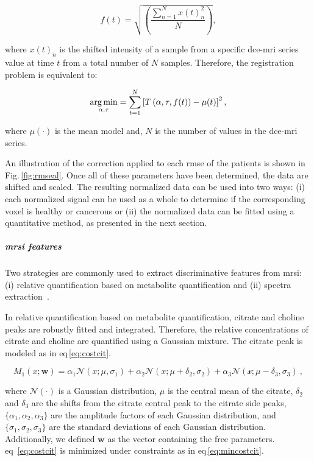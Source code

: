 \documentclass[a4paper,num-refs]{wiley-article}
\begin{document}
\begin{equation}
  f(t) = \sqrt{ \left( \frac{\sum_{n=1}^{N} x(t)_{n}^2}{N}  \right) },
  \label{eq:rmsd}
\end{equation}

\noindent where $x(t)_n$ is the shifted intensity of a sample from a specific
\ac{dce}-\ac{mri} series value at time $t$ from a total number of $N$ samples.
Therefore, the registration problem is equivalent to:

\begin{equation}
  \operatorname*{arg\,min}_{\alpha, \tau} = \sum_{t=1}^{N} \left[ T\left(\alpha, \tau, f(t)\right) - \mu(t) \right]^{2} ,
  \label{eq:cost}
\end{equation}

\noindent where $\mu(\cdot)$ is the mean model and, $N$ is the number of values
in the \ac{dce}-\ac{mri} series.

An illustration of the correction applied to each \ac{rmse} of the patients is
shown in Fig.\,\ref{fig:rmseal}. Once all of these parameters have been
determined, the data are shifted and scaled. The resulting normalized data can
be used into two ways: (i) each normalized signal can be used as a whole to
determine if the corresponding voxel is healthy or cancerous or (ii) the
normalized data can be fitted using a quantitative method, as presented in the
next section.

\subparagraph{\ac{mrsi} features}

Two strategies are commonly used to extract discriminative features from
\ac{mrsi}: (i) relative quantification based on metabolite quantification and
(ii) spectra extraction~\cite{Parfait2012}.

In relative quantification based on metabolite quantification, citrate and
choline peaks are robustly fitted and integrated. Therefore, the relative
concentrations of citrate and choline are quantified using a Gaussian
mixture. The citrate peak is modeled as in \acs{eq}\,\eqref{eq:costcit}.

\begin{equation}
  M_1(x; \mathbf{w}) = \alpha_1 \mathcal{N}(x; \mu, \sigma_1) + \alpha_2 \mathcal{N}(x; \mu + \delta_2, \sigma_2) + \alpha_3 \mathcal{N(x; \mu - \delta_3, \sigma_3)} \ ,
  \label{eq:costcit}
\end{equation}

\noindent where $\mathcal{N}(\cdot)$ is a Gaussian distribution, $\mu$ is the
central mean of the citrate, $\delta_2$ and $\delta_3$ are the shifts from the
citrate central peak to the citrate side peaks,
$\{\alpha_1, \alpha_2, \alpha_3\}$ are the amplitude factors of each Gaussian
distribution, and $\{\sigma_1, \sigma_2, \sigma_3\}$ are the standard
deviations of each Gaussian distribution. Additionally, we defined $\mathbf{w}$
as the vector containing the free parameters.
\Acl{eq}~\eqref{eq:costcit} is minimized under constraints as in
\acs{eq}\,\eqref{eq:mincostcit}.
\end{document}
